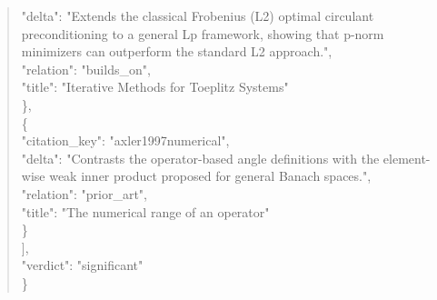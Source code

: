 \documentclass[11pt]{article}
\begin{document}
\begin{quote}
      "delta": "Extends the classical Frobenius (L2) optimal circulant preconditioning to a general Lp framework, showing that p-norm minimizers can outperform the standard L2 approach.",\\
      "relation": "builds\_on",\\
      "title": "Iterative Methods for Toeplitz Systems"\\
    \},\\
    \{\\
      "citation\_key": "axler1997numerical",\\
      "delta": "Contrasts the operator-based angle definitions with the element-wise weak inner product proposed for general Banach spaces.",\\
      "relation": "prior\_art",\\
      "title": "The numerical range of an operator"\\
    \}\\
  ],\\
  "verdict": "significant"\\
\}\\
\end{quote}
\end{document}
